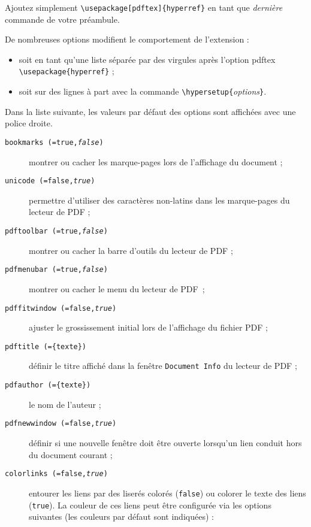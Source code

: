 Ajoutez simplement \verb+\usepackage[pdftex]{hyperref}+ en tant que
\emph{dernière} commande de votre préambule.

De nombreuses options modifient le comportement de l'extension
 :
\begin{itemize}
\item soit en tant qu'une liste séparée par des virgules après
  l'option pdftex\\
  \verb+\usepackage{hyperref}+ ;
\item soit sur des lignes à part avec la commande
  \verb+\hypersetup{+\emph{options}\verb+}+.
\end{itemize}

Dans la liste suivante, les valeurs par défaut des options sont
affichées avec une police droite.

\begin{flushleft}
\begin{description}
  \item [\texttt{bookmarks (=true,\textit{false})}] montrer ou cacher
    les marque-pages lors de l'affichage du document ;
  \item [\texttt{unicode (=false,\textit{true})}] permettre d'utiliser
    des caractères non-latins dans les marque-pages du lecteur de PDF ;
  \item [\texttt{pdftoolbar (=true,\textit{false})}] montrer ou cacher
    la barre d'outils du lecteur de PDF ;
  \item [\texttt{pdfmenubar (=true,\textit{false})}] montrer ou cacher
    le menu du lecteur de PDF~;
  \item [\texttt{pdffitwindow (=false,\textit{true})}] ajuster le
    grossissement initial lors de l'affichage du fichier PDF ;
  \item [\texttt{pdftitle (=\{texte\})}] définir le titre affiché dans
    la fenêtre \texttt{Document Info} du lecteur de PDF ;
  \item [\texttt{pdfauthor (=\{texte\})}] le nom de l'auteur ;
  \item [\texttt{pdfnewwindow (=false,\textit{true})}] définir si une
    nouvelle fenêtre doit être ouverte lorsqu'un lien conduit hors du
    document courant ;
  \item [\texttt{colorlinks (=false,\textit{true})}] entourer les
    liens par des liserés colorés (\texttt{false}) ou colorer le texte
    des liens (\texttt{true}). La couleur de ces liens peut
    être configurée via les options suivantes (les couleurs par défaut
    sont indiquées) :
    \begin{description}

\end{description}
\end{description}
\end{flushleft}
